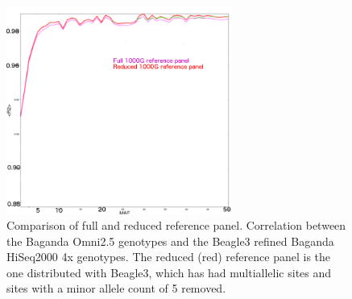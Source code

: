 \begin{figure}[htbp]
\centering
\includegraphics[width=0.66\textwidth]{fig/imp_accu_beagle}
\caption[Comparison of full and reduced reference panel.]{Comparison of full and reduced reference panel. Correlation between the Baganda Omni2.5 genotypes and the Beagle3 refined Baganda HiSeq2000 4x genotypes. The reduced (red) reference panel is the one distributed with Beagle3, which has had multiallelic sites and sites with a minor allele count of 5 removed.}
\label{fig:imp_accu_beagle}
\end{figure}